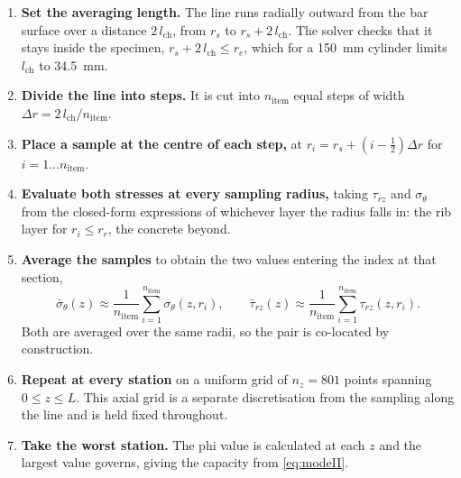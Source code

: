 \begin{enumerate}
\item \textbf{Set the averaging length.} The line runs radially outward from
      the bar surface over a distance $2\,l_{\mathrm{ch}}$, from $r_s$ to
      $r_s + 2\,l_{\mathrm{ch}}$. The solver checks that it stays inside the
      specimen, $r_s + 2\,l_{\mathrm{ch}} \le r_e$, which for a
      \SI{150}{\milli\metre} cylinder limits $l_{\mathrm{ch}}$ to
      \SI{34.5}{\milli\metre}.
 
\item \textbf{Divide the line into steps.} It is cut into
      $n_{\mathrm{item}}$ equal steps of width
      $\Delta r = 2\,l_{\mathrm{ch}}/n_{\mathrm{item}}$.
 
\item \textbf{Place a sample at the centre of each step,} at
      $r_i = r_s + \left(i - \tfrac{1}{2}\right)\Delta r$ for
      $i = 1 \dots n_{\mathrm{item}}$.
 
\item \textbf{Evaluate both stresses at every sampling radius,} taking
      $\tau_{rz}$ and $\sigma_\theta$ from the closed-form expressions of
      whichever layer the radius falls in: the rib layer for
      $r_i \le r_r$, the concrete beyond.
 
\item \textbf{Average the samples} to obtain the two values entering the
      index at that section,
      \begin{equation}
      \label{eq:lmgrid}
      \bar{\sigma}_\theta(z) \approx \frac{1}{n_{\mathrm{item}}}
        \sum_{i=1}^{n_{\mathrm{item}}} \sigma_\theta(z, r_i),
      \qquad
      \bar{\tau}_{rz}(z) \approx \frac{1}{n_{\mathrm{item}}}
        \sum_{i=1}^{n_{\mathrm{item}}} \tau_{rz}(z, r_i).
      \end{equation}
      Both are averaged over the same radii, so the pair is co-located by
      construction.
 
\item \textbf{Repeat at every station} on a uniform grid of $n_z = 801$
      points spanning $0 \le z \le L$. This axial grid is a separate
      discretisation from the sampling along the line and is held fixed
      throughout.
 
\item \textbf{Take the worst station.} The phi value is
      calculated at each $z$ and the largest value governs, giving the capacity
      from \eqref{eq:modeII}.
\end{enumerate}

